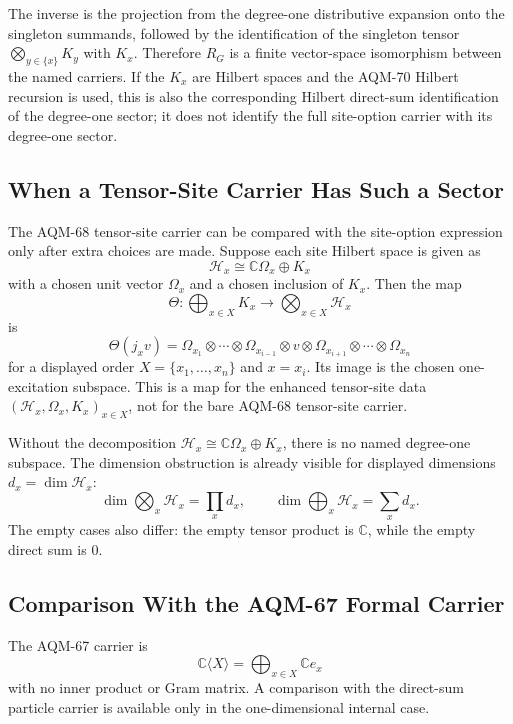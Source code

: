 The inverse is the projection from the degree-one distributive expansion onto
the singleton summands, followed by the identification of the singleton
tensor \(\bigotimes_{y\in\{x\}}K_y\) with \(K_x\).  Therefore \(R_G\) is a
finite vector-space isomorphism between the named carriers.  If the \(K_x\)
are Hilbert spaces and the AQM-70 Hilbert recursion is used, this is also the
corresponding Hilbert direct-sum identification of the degree-one sector; it
does not identify the full site-option carrier with its degree-one sector.

\subsection{When a Tensor-Site Carrier Has Such a Sector}

The AQM-68 tensor-site carrier can be compared with the site-option expression
only after extra choices are made.  Suppose each site Hilbert space is given
as
\[
  \mathcal H_x\cong \mathbb C\Omega_x\oplus K_x
\]
with a chosen unit vector \(\Omega_x\) and a chosen inclusion of \(K_x\).
Then the map
\[
  \Theta:\bigoplus_{x\in X}K_x
  \longrightarrow
  \bigotimes_{x\in X}\mathcal H_x
\]
is
\[
  \Theta(j_x v)=
  \Omega_{x_1}\otimes\cdots\otimes
  \Omega_{x_{i-1}}\otimes v\otimes
  \Omega_{x_{i+1}}\otimes\cdots\otimes\Omega_{x_n}
\]
for a displayed order \(X=\{x_1,\ldots,x_n\}\) and \(x=x_i\).
Its image is the chosen one-excitation subspace.  This is a map for the
enhanced tensor-site data
\((\mathcal H_x,\Omega_x,K_x)_{x\in X}\), not for the bare AQM-68 tensor-site
carrier.

Without the decomposition \(\mathcal H_x\cong\mathbb C\Omega_x\oplus K_x\),
there is no named degree-one subspace.  The dimension obstruction is already
visible for displayed dimensions \(d_x=\dim\mathcal H_x\):
\[
  \dim\bigotimes_x\mathcal H_x=\prod_x d_x,
  \qquad
  \dim\bigoplus_x\mathcal H_x=\sum_x d_x.
\]
The empty cases also differ: the empty tensor product is \(\mathbb C\), while
the empty direct sum is \(0\).

\subsection{Comparison With the AQM-67 Formal Carrier}

The AQM-67 carrier is
\[
  \mathbb C\langle X\rangle=\bigoplus_{x\in X}\mathbb C e_x
\]
with no inner product or Gram matrix.  A comparison with the direct-sum
particle carrier is available only in the one-dimensional internal case.

